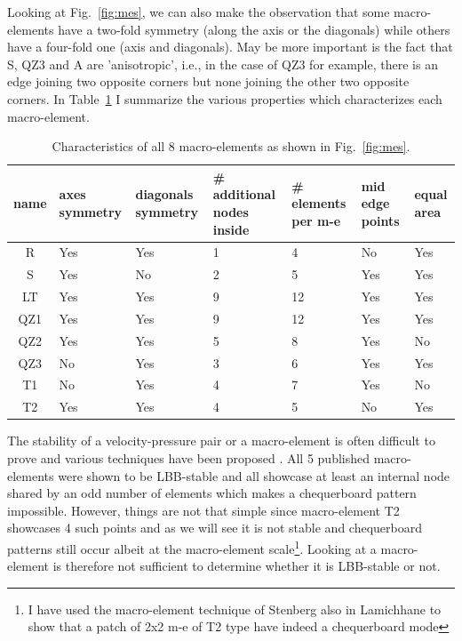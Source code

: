 \documentclass[a4paper,12pt]{article}
\begin{document}
Looking  at Fig.~\ref{fig:mes}, we can also make the observation that some macro-elements 
have a two-fold symmetry (along the axis or the diagonals) while others have a four-fold one 
(axis and diagonals). May be more important is the fact that S, QZ3 and A are 'anisotropic', i.e., in 
the case of QZ3 for example, there is an edge joining two opposite corners but none joining the 
other two opposite corners.
In Table~\ref{tab1} I summarize the various properties which characterizes each macro-element.

\begin{table}
\centering
\begin{tabular}{cp{2cm}p{2cm}p{2.5cm}p{2cm}p{2cm}p{2cm}}
\hline
{name} & {axes symmetry}  & {diagonals symmetry} & {\# additional nodes inside} 
& {\# elements per m-e} & {mid edge points} & equal area \\
\hline
\hline
R   &  Yes &  Yes & 1  & 4 & No  & Yes\\
S   &  Yes &   No & 2  & 5 & Yes & Yes\\
LT  &  Yes &  Yes & 9 & 12 & Yes & Yes\\
QZ1 &  Yes &  Yes & 9 & 12 & Yes & Yes\\
QZ2 &  Yes &  Yes & 5 & 8  & Yes & No\\
QZ3 &  No  &  Yes & 3 & 6  & Yes & Yes\\
T1  &  No  &  Yes & 4 & 7  & Yes & No\\
T2  &  Yes &  Yes & 4 & 5  & No  & Yes\\
\hline
\end{tabular}
\caption{Characteristics of all 8 macro-elements as shown in Fig.~\ref{fig:mes}.\label{tab1}}%
\end{table}

The stability of a velocity-pressure pair or a macro-element is often difficult to prove 
and various techniques have been proposed \cite{bobf13}. 
All 5 published macro-elements were shown to be LBB-stable and all showcase at least 
an internal node shared by an odd number of elements which makes a chequerboard pattern impossible. 
However, things are not that simple since macro-element T2 showcases 
4 such points and as we will see it is not stable and chequerboard patterns still occur 
albeit at the macro-element scale\footnote{I have used the macro-element technique of Stenberg 
also in Lamichhane to show that a patch of 2x2 m-e of T2 type have indeed a chequerboard mode}. 
Looking at a macro-element is therefore not sufficient to determine whether it is LBB-stable or not. 
\end{document}
